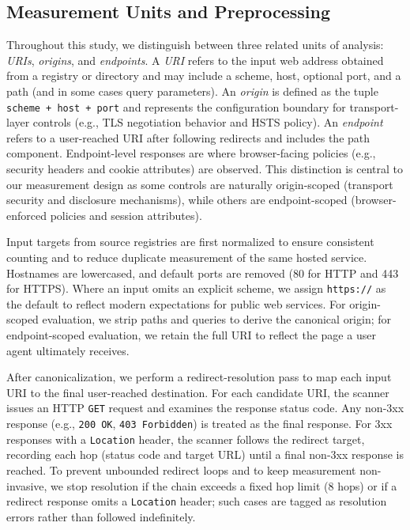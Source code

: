 \documentclass[a4paper,fleqn]{cas-sc}
\begin{document}
\subsection{Measurement Units and Preprocessing}\label{sec:measurement_units}
Throughout this study, we distinguish between three related units of analysis: \emph{URIs}, \emph{origins}, and \emph{endpoints}.
    A \emph{URI} refers to the input web address obtained from a registry or directory and may include a scheme, host, optional port, and a path (and in some cases query parameters).
    An \emph{origin} is defined as the tuple \texttt{scheme + host + port} and represents the configuration boundary for transport-layer controls (e.g., TLS negotiation behavior and HSTS policy).
    An \emph{endpoint} refers to a user-reached URI after following redirects and includes the path component. Endpoint-level responses are where browser-facing policies (e.g., security headers and cookie attributes) are observed.
    This distinction is central to our measurement design as some controls are naturally origin-scoped (transport security and disclosure mechanisms), while others are endpoint-scoped (browser-enforced policies and session attributes). 

    Input targets from source registries are first normalized to ensure consistent counting and to reduce duplicate measurement of the same hosted service.
    Hostnames are lowercased, and default ports are removed (80 for HTTP and 443 for HTTPS).
    Where an input omits an explicit scheme, we assign \texttt{https://} as the default to reflect modern expectations for public web services.
    For origin-scoped evaluation, we strip paths and queries to derive the canonical origin; for endpoint-scoped evaluation, we retain the full URI to reflect the page a user agent ultimately receives.

    After canonicalization, we perform a redirect-resolution pass to map each input URI to the final user-reached destination.
    For each candidate URI, the scanner issues an HTTP \texttt{GET} request and examines the response status code.
    Any non-3xx response (e.g., \texttt{200 OK}, \texttt{403 Forbidden}) is treated as the final response.
    For 3xx responses with a \texttt{Location} header, the scanner follows the redirect target, recording each hop (status code and target URL) until a final non-3xx response is reached.
    To prevent unbounded redirect loops and to keep measurement non-invasive, we stop resolution if the chain exceeds a fixed hop limit (8 hops) or if a redirect response omits a \texttt{Location} header; such cases are tagged as resolution errors rather than followed indefinitely. 
    
\end{document}

